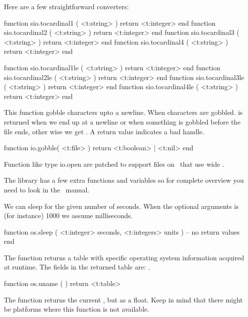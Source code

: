Here are a few straightforward converters:

\starttyping[option=LUA]
function sio.tocardinal1 ( <t:string> ) return <t:integer> end
function sio.tocardinal2 ( <t:string> ) return <t:integer> end
function sio.tocardinal3 ( <t:string> ) return <t:integer> end
function sio.tocardinal4 ( <t:string> ) return <t:integer> end

function sio.tocardinal1le ( <t:string> ) return <t:integer> end
function sio.tocardinal2le ( <t:string> ) return <t:integer> end
function sio.tocardinal3le ( <t:string> ) return <t:integer> end
function sio.tocardinal4le ( <t:string> ) return <t:integer> end
\stoptyping

\stopsubsection

\startsubsection[title=Extra file helpers]

This function gobble characters upto a newline. When characters are gobbled.
 is returned when we end up at a newline or when something is gobbled
before the file ends, other wise we get . A  return value
indicates a bad handle.

\starttyping[option=LUA]
function io.gobble( <t:file> )
    return <t:boolean> | <t:nil>
end
\stoptyping

Function like type {io.open}  are patched to support files on
\MSWINDOWS\ that use wide \UNICODE.

\stopsubsection

\startsubsection[title=Extra operating system helpers]

The  library has a few extra functions and variables so for complete
overview you need to look in the \LUA\ manual.

We can sleep for the given number of seconds. When the optional 
arguments is (for instance) 1000 we assume milliseconds.

\starttyping[option=LUA]
function os.sleep (
    <t:integer>  seconds,
    <t:integers> units
)
    -- no return values
end
\stoptyping

The  function returns a table with specific operating system
information acquired at runtime. The fields in the returned table are:
.

\starttyping[option=LUA]
function os.uname ( )
    return <t:table>
\stoptyping

The  function returns the current ,
but as a float. Keep in mind that there might be platforms where this function is
not available.

